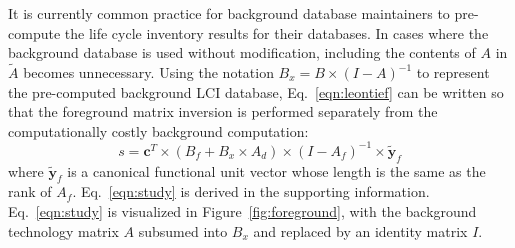 
It is currently common practice for background database maintainers to pre-compute the life cycle inventory results for their databases.  In cases where the background database is used without modification, including the contents of $A$ in $\tilde{A}$ becomes unnecessary.
Using the notation $B_x = B \times (I - A)^{-1}$ to represent the pre-computed background LCI database, %
%
Eq.~\ref{eqn:leontief} can be written so that the foreground matrix inversion is  performed separately from the computationally costly background computation:
\begin{equation}
s = \mathbf{c}^T \times (B_f + B_x\times A_d) \times (I - A_f)^{-1} \times \tilde{\mathbf{y}}_f
\label{eqn:study}
\end{equation}
where $\tilde{\mathbf{y}}_f$ is a canonical functional unit vector whose length is the same as the rank of $A_f$. Eq.~\ref{eqn:study} is derived in the supporting information.
Eq.~\ref{eqn:study} is visualized in Figure~\ref{fig:foreground}, with the background technology matrix $A$ subsumed into $B_x$ and replaced by an identity matrix $I$.  


